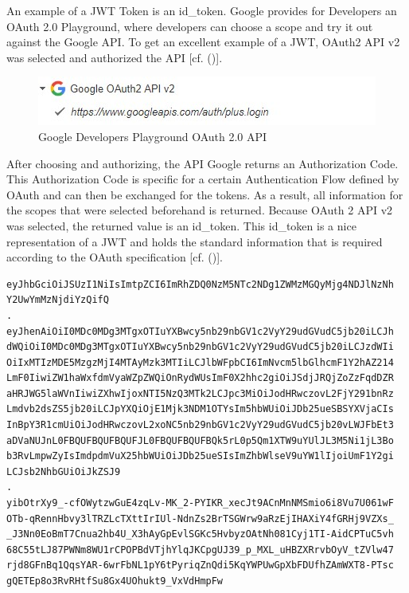 An example of a JWT Token is an id\_token. Google provides for Developers an OAuth 2.0 Playground, where developers can choose a scope and try it out against the Google API. To get an excellent example of a JWT, OAuth2 API v2 was selected and authorized the API [cf. (\cite{Google:2018:OAuthPlayground})].


\begin{figure}[h]
	\centering
	\includegraphics[width=0.8\linewidth]{images/googleOAuthPlaygroundOAuthAPI}
	\caption[OAuth API]{Google Developers Playground OAuth 2.0 API}
	\label{fig:googleoauthplaygroundoauthapi}
\end{figure}

After choosing and authorizing, the API Google returns an Authorization Code. This Authorization Code is specific for a certain Authentication Flow defined by OAuth and can then be exchanged for the tokens. As a result, all information for the scopes that were selected beforehand is returned. Because OAuth 2 API v2 was selected, the returned value is an id\_token. This id\_token is a nice representation of a JWT and holds the standard information that is required according to the OAuth specification  [cf. (\cite{Google:2018:OAuthPlayground})].



\begin{lstlisting}
eyJhbGciOiJSUzI1NiIsImtpZCI6ImRhZDQ0NzM5NTc2NDg1ZWMzMGQyMjg4NDJlNzNh
Y2UwYmMzNjdiYzQifQ
.
eyJhenAiOiI0MDc0MDg3MTgxOTIuYXBwcy5nb29nbGV1c2VyY29udGVudC5jb20iLCJh
dWQiOiI0MDc0MDg3MTgxOTIuYXBwcy5nb29nbGV1c2VyY29udGVudC5jb20iLCJzdWIi
OiIxMTIzMDE5MzgzMjI4MTAyMzk3MTIiLCJlbWFpbCI6ImNvcm5lbGlhcmF1Y2hAZ214
LmF0IiwiZW1haWxfdmVyaWZpZWQiOnRydWUsImF0X2hhc2giOiJSdjJRQjZoZzFqdDZR
aHRJWG5laWVnIiwiZXhwIjoxNTI5NzQ3MTk2LCJpc3MiOiJodHRwczovL2FjY291bnRz
Lmdvb2dsZS5jb20iLCJpYXQiOjE1Mjk3NDM1OTYsIm5hbWUiOiJDb25ueSBSYXVjaCIs
InBpY3R1cmUiOiJodHRwczovL2xoNC5nb29nbGV1c2VyY29udGVudC5jb20vLWJFbEt3
aDVaNUJnL0FBQUFBQUFBQUFJL0FBQUFBQUFBQk5rL0p5Qm1XTW9uYUlJL3M5Ni1jL3Bo
b3RvLmpwZyIsImdpdmVuX25hbWUiOiJDb25ueSIsImZhbWlseV9uYW1lIjoiUmF1Y2gi
LCJsb2NhbGUiOiJkZSJ9
.
yibOtrXy9_-cfOWytzwGuE4zqLv-MK_2-PYIKR_xecJt9ACnMnNMSmio6i8Vu7U061wF
OTb-qRennHbvy3lTRZLcTXttIrIUl-NdnZs2BrTSGWrw9aRzEjIHAXiY4fGRHj9VZXs_
_J3Nn0EoBmT7Cnua2hb4U_X3hAyGpEvlSGKc5HvbyzOAtNh081Cyj1TI-AidCPTuC5vh
68C55tLJ87PWNm8WU1rCPOPBdVTjhYlqJKCpgUJ39_p_MXL_uHBZXRrvbOyV_tZVlw47
rjd8GFnBq1QqsYAR-6wrFbNL1pY6tPyriqZnQdi5KqYWPUwGpXbFDUfhZAmWXT8-PTsc
gQETEp8o3RvRHtfSu8Gx4UOhukt9_VxVdHmpFw
\end{lstlisting}


